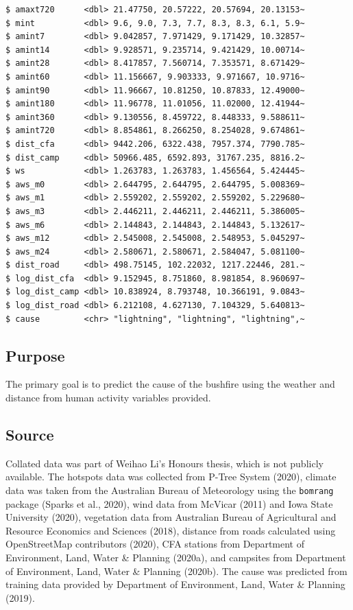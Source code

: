 \documentclass[
  letterpaper,
]{krantz}
\begin{document}
\begin{verbatim}
$ amaxt720      <dbl> 21.47750, 20.57222, 20.57694, 20.13153~
$ mint          <dbl> 9.6, 9.0, 7.3, 7.7, 8.3, 8.3, 6.1, 5.9~
$ amint7        <dbl> 9.042857, 7.971429, 9.171429, 10.32857~
$ amint14       <dbl> 9.928571, 9.235714, 9.421429, 10.00714~
$ amint28       <dbl> 8.417857, 7.560714, 7.353571, 8.671429~
$ amint60       <dbl> 11.156667, 9.903333, 9.971667, 10.9716~
$ amint90       <dbl> 11.96667, 10.81250, 10.87833, 12.49000~
$ amint180      <dbl> 11.96778, 11.01056, 11.02000, 12.41944~
$ amint360      <dbl> 9.130556, 8.459722, 8.448333, 9.588611~
$ amint720      <dbl> 8.854861, 8.266250, 8.254028, 9.674861~
$ dist_cfa      <dbl> 9442.206, 6322.438, 7957.374, 7790.785~
$ dist_camp     <dbl> 50966.485, 6592.893, 31767.235, 8816.2~
$ ws            <dbl> 1.263783, 1.263783, 1.456564, 5.424445~
$ aws_m0        <dbl> 2.644795, 2.644795, 2.644795, 5.008369~
$ aws_m1        <dbl> 2.559202, 2.559202, 2.559202, 5.229680~
$ aws_m3        <dbl> 2.446211, 2.446211, 2.446211, 5.386005~
$ aws_m6        <dbl> 2.144843, 2.144843, 2.144843, 5.132617~
$ aws_m12       <dbl> 2.545008, 2.545008, 2.548953, 5.045297~
$ aws_m24       <dbl> 2.580671, 2.580671, 2.584047, 5.081100~
$ dist_road     <dbl> 498.75145, 102.22032, 1217.22446, 281.~
$ log_dist_cfa  <dbl> 9.152945, 8.751860, 8.981854, 8.960697~
$ log_dist_camp <dbl> 10.838924, 8.793748, 10.366191, 9.0843~
$ log_dist_road <dbl> 6.212108, 4.627130, 7.104329, 5.640813~
$ cause         <chr> "lightning", "lightning", "lightning",~
\end{verbatim}

\subsection*{Purpose}\label{purpose-1}

The primary goal is to predict the cause of the bushfire using the
weather and distance from human activity variables provided.

\subsection*{Source}\label{source-1}

Collated data was part of Weihao Li's Honours thesis, which is not
publicly available. The hotspots data was collected from P-Tree System
(2020), climate data was taken from the Australian Bureau of Meteorology
using the \texttt{bomrang} package (Sparks et al., 2020), wind data from
McVicar (2011) and Iowa State University (2020), vegetation data from
Australian Bureau of Agricultural and Resource Economics and Sciences
(2018), distance from roads calculated using OpenStreetMap contributors
(2020), CFA stations from Department of Environment, Land, Water \&
Planning (2020a), and campsites from Department of Environment, Land,
Water \& Planning (2020b). The cause was predicted from training data
provided by Department of Environment, Land, Water \& Planning (2019).
\end{document}
